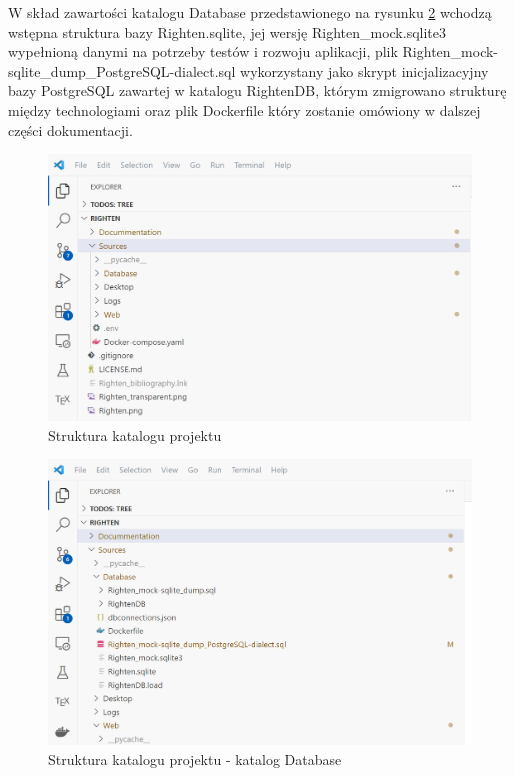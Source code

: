 \documentclass[a4paper,10pt, twoside]{report}
\begin{document}
\begin{large}
{W skład zawartości katalogu Database przedstawionego na rysunku 
\ref*{fig:projectdirectorydb}  wchodzą wstępna struktura bazy Righten.sqlite, 
jej wersję Righten\_mock.sqlite3 wypełnioną danymi na potrzeby testów i rozwoju 
aplikacji, plik Righten\_mock-sqlite\_dump\_PostgreSQL-dialect.sql wykorzystany 
jako skrypt inicjalizacyjny bazy PostgreSQL zawartej w katalogu RightenDB, 
którym zmigrowano strukturę między technologiami oraz plik Dockerfile który 
zostanie omówiony w dalszej części dokumentacji.}

\begin{figure}[H]           %
    \centering
    \includegraphics[width=12cm]{figures/Righten_project_directory_top.png}
    \caption{Struktura katalogu projektu}
    \label{fig:projectdirectorytop}
\end{figure}

\begin{figure}[H]           %
    \centering
    \includegraphics[width=12cm]{figures/Righten_project_directory_sources_Database.png}
    \caption{Struktura katalogu projektu - katalog Database}
    \label{fig:projectdirectorydb}
\end{figure}


\end{large}
\end{document}
